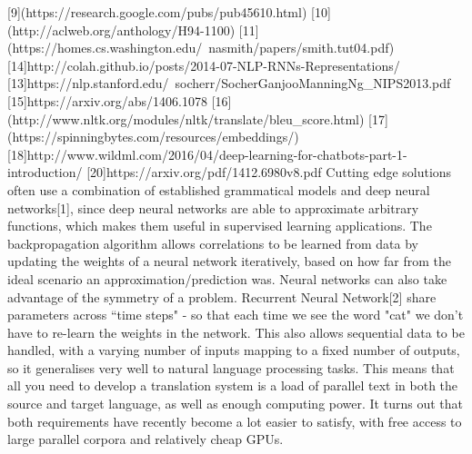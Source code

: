 \documentclass[]{article}
\begin{document}
[9](https://research.google.com/pubs/pub45610.html)
[10](http://aclweb.org/anthology/H94-1100)
[11](https://homes.cs.washington.edu/~nasmith/papers/smith.tut04.pdf)
[14]http://colah.github.io/posts/2014-07-NLP-RNNs-Representations/
[13]https://nlp.stanford.edu/~socherr/SocherGanjooManningNg_NIPS2013.pdf
[15]https://arxiv.org/abs/1406.1078
[16](http://www.nltk.org/modules/nltk/translate/bleu_score.html)
[17](https://spinningbytes.com/resources/embeddings/)
[18]http://www.wildml.com/2016/04/deep-learning-for-chatbots-part-1-introduction/
[20]https://arxiv.org/pdf/1412.6980v8.pdf
\fi
Cutting edge solutions often use a combination of established grammatical models and deep neural networks[1], since deep neural networks are able to approximate arbitrary functions, which makes them useful in supervised learning applications. The backpropagation algorithm allows correlations to be learned from data by updating the weights of a neural network iteratively, based on how far from the ideal scenario an approximation/prediction was. Neural networks can also take advantage of the symmetry of a problem. Recurrent Neural Network[2] share parameters across ``time steps" - so that each time we see the word "cat" we don't have to re-learn the weights in the network. This also allows sequential data to be handled, with a varying number of inputs mapping to a fixed number of outputs, so it generalises very well to natural language processing tasks. This means that all you need to develop a translation system is a load of parallel text in both the source and target language, as well as enough computing power. It turns out that both requirements have recently become a lot easier to satisfy, with free access to large parallel corpora and relatively cheap GPUs.
\end{document}
